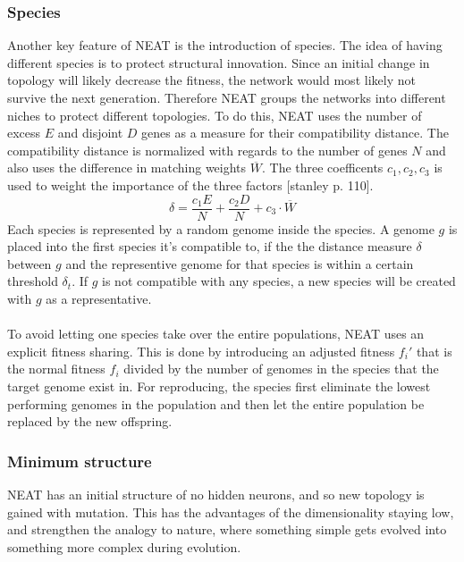 \subsubsection{Species}
Another key feature of NEAT is the introduction  of species. The idea of having different species is to protect structural innovation. Since an initial change in topology will likely decrease the fitness, the network would most likely not survive the next generation. Therefore NEAT groups the networks into different niches to protect different topologies. To do this, NEAT uses the number of excess $ E $ and disjoint $ D $ genes as a measure for their compatibility distance. The compatibility distance is normalized with regards to the number of genes $ N $ and also uses the difference in matching weights $ \overline{W} $. The three coefficents $ c_1, c_2, c_3$ is used to weight the importance of the three factors [stanley p. 110].
\begin{equation}
\delta = \dfrac{c_1E}{N}+\dfrac{c_2D}{N}+c_3\cdot\overline{W}
\end{equation}
Each species is represented by a random genome inside the species. A genome $ g $ is placed into the first species it's compatible to, if the the distance measure $ \delta $ between $ g $ and the representive genome for that species is within a certain threshold $ \delta_t $. If $ g $ is not compatible with any species, a new species will be created with $ g $ as a representative.
\\
\\
To avoid letting one species take over the entire populations, NEAT uses an explicit fitness sharing. This is done by introducing an adjusted fitness $ f_i'$ that is the normal fitness $ f_i $ divided by the number of genomes in the species that the target genome exist in. For reproducing, the species first eliminate the lowest performing genomes in the population and then let the entire population be replaced by the new offspring.
\subsubsection{Minimum structure}
NEAT has an initial structure of no hidden neurons, and  so new topology is gained with mutation. This has the advantages of the dimensionality staying low, and strengthen the analogy to nature, where something simple gets evolved into something more complex during evolution.
